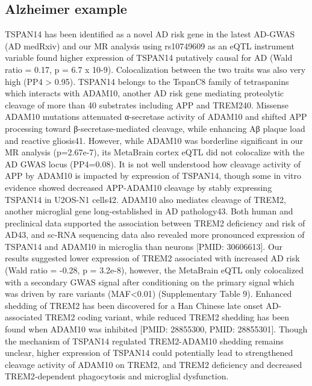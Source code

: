 \subsection{Alzheimer example}
TSPAN14 has been identified as a novel AD risk gene in the latest AD-GWAS (AD medRxiv) and our MR analysis using rs10749609 as an eQTL instrument variable found higher expression of TSPAN14 putatively causal for AD (Wald ratio = 0.17, p = 6.7 x 10-9). Colocalization between the two traits was also very high (PP4 > 0.95). TSPAN14 belongs to the TspanC8 family of tetraspanins which interacts with ADAM10​, another AD risk gene mediating proteolytic cleavage of more than 40 substrates including APP and TREM240. Missense ADAM10 mutations attenuated α-secretase activity of ADAM10 and shifted APP processing toward β-secretase-mediated cleavage, while enhancing Aβ plaque load and reactive gliosis41. However, while ADAM10 was borderline significant in our MR analysis (p=2.67e-7), its MetaBrain cortex eQTL did not colocalize with the AD GWAS locus (PP4=0.08). It is not well understood how cleavage activity of APP by ADAM10 is impacted by expression of TSPAN14, though some in vitro evidence showed decreased APP-ADAM10 cleavage by stably expressing TSPAN14 in U2OS-N1 cells42. ADAM10 also mediates cleavage of TREM2, another microglial gene long-established in AD pathology43. Both human and preclinical data supported the association between TREM2 deficiency and risk of AD43, and sc-RNA sequencing data also revealed more pronounced expression of TSPAN14 and ADAM10 in microglia than neurons [PMID: 30606613]. Our results suggested lower expression of TREM2 associated with increased AD risk (Wald ratio = -0.28, p = 3.2e-8), however, the MetaBrain eQTL only colocalized with a secondary GWAS signal after conditioning on the primary signal which was driven by rare variants (MAF<0.01) (Supplementary Table 9). Enhanced shedding of TREM2 has been discovered for a Han Chinese late onset AD-associated TREM2 coding variant, while reduced TREM2 shedding has been found when ADAM10 was inhibited [PMID: 28855300, PMID: 28855301]. Though the mechanism of TSPAN14 regulated TREM2-ADAM10 shedding remains unclear, higher expression of TSPAN14 could potentially lead to strengthened cleavage activity of ADAM10 on TREM2, and TREM2 deficiency and decreased TREM2‐dependent phagocytosis and microglial dysfunction. 

